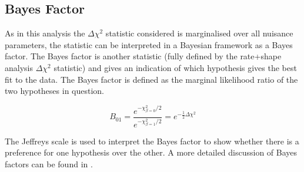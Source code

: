 


\subsection{Bayes Factor} \label{sec:bayes}
As in this analysis the $\Delta \chi^2$ statistic considered is marginalised over all nuisance parameters, the statistic can be interpreted in a Bayesian framework as a Bayes factor. The Bayes factor is another statistic (fully defined by the rate+shape analysis $\Delta \chi^2$ statistic) and gives an indication of which hypothesis gives the best fit to the data. The Bayes factor is defined as the marginal likelihood ratio of the two hypotheses in question.

\begin{equation} \label{eq:bayes_factor}
B_{01} = \frac{e^{-\chi^2_{\beta = 0}/2}}{e^{-\chi^2_{\beta = 1}/2}} = e^{-\frac{1}{2}\Delta \chi^2}
\end{equation}

The Jeffreys scale \cite{JeffreysScale} is used to interpret the Bayes factor to show whether there is a preference for one hypothesis over the other. A more detailed discussion of Bayes factors can be found in \cite{MaCH3NuebarAppearance2015}.



